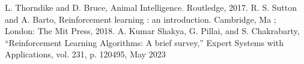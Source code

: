 \documentclass[conference]{IEEEtran}
\begin{document}
\begin{thebibliography}{00}
    
    
    
     L. Thorndike and D. Bruce, Animal Intelligence. Routledge, 2017.
     R. S. Sutton and A. Barto, Reinforcement learning : an introduction. Cambridge, Ma ; London: The Mit Press, 2018.
     A. Kumar Shakya, G. Pillai, and S. Chakrabarty, “Reinforcement Learning Algorithms: A brief survey,” Expert Systems with Applications, vol. 231, p. 120495, May 2023
    

\end{thebibliography}
\vspace{12pt}
\end{document}
